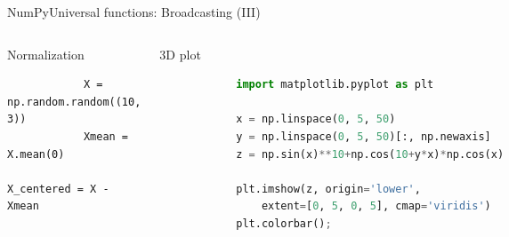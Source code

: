 \documentclass[10pt,compress]{beamer} %
\begin{document}
\begin{frame}[fragile]{NumPy}{Universal functions: Broadcasting (III)}
	\vspace{-0.2cm} 
	\begin{columns}
		\begin{exampleblock}{Normalization}
		\vspace{-0.2cm} 
			\begin{lstlisting}
			X = np.random.random((10, 3))
			Xmean = X.mean(0)
			X_centered = X - Xmean
			\end{lstlisting}
		\vspace{-0.2cm} 
		\end{exampleblock}

		\begin{exampleblock}{3D plot}
		\vspace{-0.2cm} 
			\begin{lstlisting}[language=Python]
			%matplotlib inline
			import matplotlib.pyplot as plt

			x = np.linspace(0, 5, 50)
			y = np.linspace(0, 5, 50)[:, np.newaxis]
			z = np.sin(x)**10+np.cos(10+y*x)*np.cos(x)

			plt.imshow(z, origin='lower', 
			    extent=[0, 5, 0, 5], cmap='viridis')
			plt.colorbar();
			\end{lstlisting}
		\vspace{-0.2cm} 
		\end{exampleblock}

			\includegraphics[width=\textwidth]{figs/3dplot.pdf}	
	\end{columns}
\end{frame}
\end{document}
